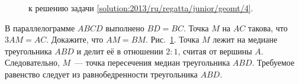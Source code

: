 \ifsolution
\begin{figure}\centering
    \caption{к решению задачи \ref{solution:2013/ru/regatta/junior/geomt/4}.}
    \label{fig:solution:2013/ru/regatta/junior/geomt/4}
\end{figure}%
\fi %

\problem
В параллелограмме $ABCD$ выполнено $BD = BC$.
Точка $M$ на $AC$ такова, что $3 AM = AC$.
Докажите, что $AM = BM$.
\solution
\label{solution:2013/ru/regatta/junior/geomt/4}%
Рис.~\ref{fig:solution:2013/ru/regatta/junior/geomt/4}.
Точка $M$ лежит на медиане треугольника $ABD$ и делит её в отношении $2 : 1$,
считая от вершины $A$.
Следовательно, $M$~--- точка пересечения медиан треугольника $ABD$.
Требуемое равенство следует из равнобедренности треугольника $ABD$.
\endproblem
